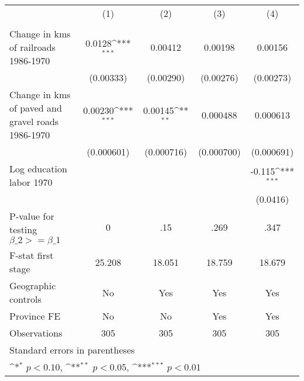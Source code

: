 {
\def\sym#1{\ifmmode^{#1}\else\(^{#1}\)\fi}
\begin{tabular}{l*{4}{c}}
\hline\hline
                &\multicolumn{1}{c}{(1)}&\multicolumn{1}{c}{(2)}&\multicolumn{1}{c}{(3)}&\multicolumn{1}{c}{(4)}\\
                &\multicolumn{1}{c}{}&\multicolumn{1}{c}{}&\multicolumn{1}{c}{}&\multicolumn{1}{c}{}\\
\hline
Change in kms of railroads 1986-1970&   0.0128\sym{***}&  0.00412         &  0.00198         &  0.00156         \\
                &(0.00333)         &(0.00290)         &(0.00276)         &(0.00273)         \\
[1em]
Change in kms of paved and gravel roads 1986-1970&  0.00230\sym{***}&  0.00145\sym{**} & 0.000488         & 0.000613         \\
                &(0.000601)         &(0.000716)         &(0.000700)         &(0.000691)         \\
[1em]
Log education labor 1970&                  &                  &                  &   -0.115\sym{***}\\
                &                  &                  &                  & (0.0416)         \\
\hline
P-value for testing $\beta\_{2} >= \beta\_{1}$&        0         &      .15         &     .269         &     .347         \\
F-stat first stage&   25.208         &   18.051         &   18.759         &   18.679         \\
Geographic controls&       No         &      Yes         &      Yes         &      Yes         \\
Province FE     &       No         &       No         &      Yes         &      Yes         \\
Observations    &      305         &      305         &      305         &      305         \\
\hline\hline
\multicolumn{5}{l}{\footnotesize Standard errors in parentheses}\\
\multicolumn{5}{l}{\footnotesize \sym{*} \(p<0.10\), \sym{**} \(p<0.05\), \sym{***} \(p<0.01\)}\\
\end{tabular}
}

